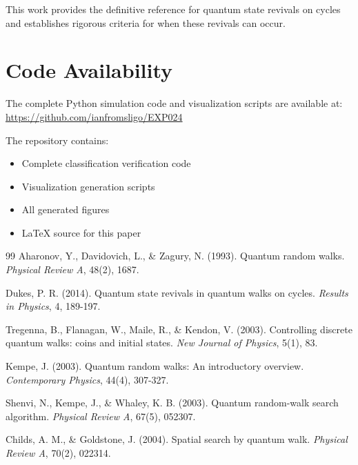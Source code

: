 \documentclass[12pt]{article}
\begin{document}
This work provides the definitive reference for quantum state revivals on cycles and establishes rigorous criteria for when these revivals can occur.

\section*{Code Availability}

The complete Python simulation code and visualization scripts are available at:
\url{https://github.com/ianfromsligo/EXP024}

The repository contains:
\begin{itemize}
    \item Complete classification verification code
    \item Visualization generation scripts
    \item All generated figures
    \item LaTeX source for this paper
\end{itemize}

\begin{thebibliography}{99}
Aharonov, Y., Davidovich, L., \& Zagury, N. (1993). Quantum random walks. \textit{Physical Review A}, 48(2), 1687.

Dukes, P. R. (2014). Quantum state revivals in quantum walks on cycles. \textit{Results in Physics}, 4, 189-197.

Tregenna, B., Flanagan, W., Maile, R., \& Kendon, V. (2003). Controlling discrete quantum walks: coins and initial states. \textit{New Journal of Physics}, 5(1), 83.

Kempe, J. (2003). Quantum random walks: An introductory overview. \textit{Contemporary Physics}, 44(4), 307-327.

Shenvi, N., Kempe, J., \& Whaley, K. B. (2003). Quantum random-walk search algorithm. \textit{Physical Review A}, 67(5), 052307.

Childs, A. M., \& Goldstone, J. (2004). Spatial search by quantum walk. \textit{Physical Review A}, 70(2), 022314.
\end{thebibliography}
\end{document}
